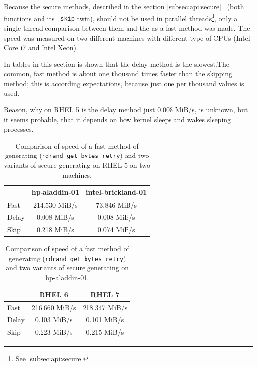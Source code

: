 \par{
Because the secure methods, described in the section \ref{subsec:api:secure}~ (both functions  and its {\tt \_skip} twin), should not be used in parallel threads\footnote{See \ref{subsec:api:secure}}, only a single thread comparison between them and the  as a fast method was made. The speed was measured on two different machines with different type of CPUs (Intel Core i7 and Intel Xeon).
}

\par{
In tables in this section is shown that the delay method is the slowest.The common, fast method is about one thousand times faster than the skipping method; this is according expectations, because just one per thousand values is used. 
}

\par{
Reason, why on RHEL 5 is the delay method just 0.008 MiB/s, is unknown, but it seems probable, that it depends on how kernel sleeps and wakes sleeping processes.
}

\begin{table}[h!]
\begin{center}
\begin{tabular}{|l|c|c|}
  \hline
   & hp-aladdin-01 & intel-brickland-01\\
  \hline
  Fast & 214.530 MiB/s & 73.846 MiB/s\\ 
  \hline
  Delay &  0.008 MiB/s & 0.008 MiB/s\\
  \hline
  Skip & 0.218 MiB/s & 0.074 MiB/s\\
  \hline
\end{tabular}
\caption{Comparison of speed of a fast method of generating ({\tt rdrand\_get\_bytes\_retry}) and two variants of secure generating on RHEL 5 on two machines.}
\label{tab:testing:fastAndSecure1}
\end{center}
\end{table}


\begin{table}[h!]
\begin{center}
\begin{tabular}{|l|c|c|}
  \hline
   & RHEL 6 & RHEL 7\\
  \hline
  Fast & 216.660 MiB/s & 218.347 MiB/s\\ 
  \hline
  Delay &  0.103 MiB/s & 0.101 MiB/s\\
  \hline
  Skip & 0.223 MiB/s & 0.215 MiB/s\\
  \hline
\end{tabular}
\caption{Comparison of speed of a fast method of generating ({\tt rdrand\_get\_bytes\_retry}) and two variants of secure generating on hp-aladdin-01.}
\label{tab:testing:fastAndSecure2}
\end{center}
\end{table}

